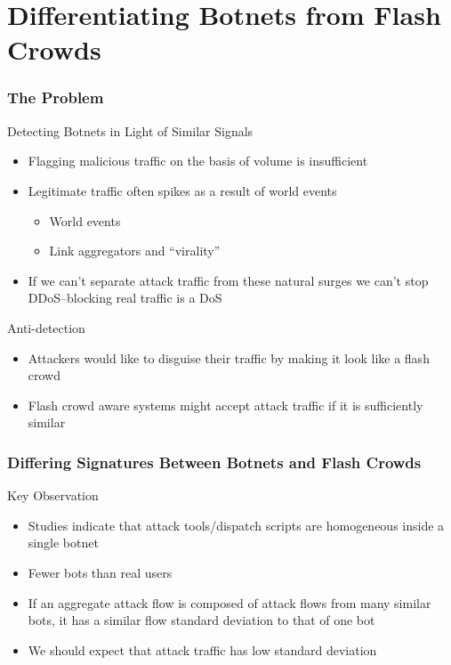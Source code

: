 \documentclass[10pt,mathserif]{beamer}
\begin{document}
\section{Differentiating Botnets from Flash Crowds}
\begin{frame}
  \frametitle{The Problem}
  \begin{block}{Detecting Botnets in Light of Similar Signals}
    \begin{itemize}
    \item Flagging malicious traffic on the basis of volume is
      insufficient
    \item Legitimate traffic often spikes as a result of world events
      \begin{itemize}
      \item World events
      \item Link aggregators and ``virality''
      \end{itemize}
    \item If we can't separate attack traffic from these natural surges
      we can't stop DDoS--blocking real traffic is a DoS
    \end{itemize}
  \end{block}
  \begin{block}{Anti-detection}
    \begin{itemize}
    \item Attackers would like to disguise their traffic by making it
      look like a flash crowd
    \item Flash crowd aware systems might accept attack traffic if it is
      sufficiently similar
    \end{itemize}
  \end{block}
\end{frame}

\begin{frame}
  \frametitle{Differing Signatures Between Botnets and Flash Crowds}
  \begin{block}{Key Observation}
    \begin{itemize}
    \item Studies indicate that attack tools/dispatch scripts are
      homogeneous inside a single botnet
    \item Fewer bots than real users
    \item If an aggregate attack flow is composed of attack flows from
      many similar bots, it has a similar flow standard deviation to that of one
      bot
    \item We should expect that attack traffic has low standard deviation
    \end{itemize}
  \end{block}
\end{frame}
\end{document}
